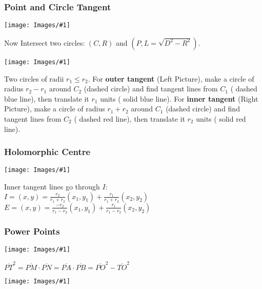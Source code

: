 \documentclass[landscape,10pt]{article}
\newcommand{\myimage}[2]{\begin{center}\texttt{[image: Images/\#1]}\end{center}}
\begin{document}
\begin{multicols*}{2}

\subsubsection*{Point and Circle Tangent}
\myimage{point_tangent.png}{1.25in}
Now Intersect two circles: $(C,R)$ and $(P,L=\sqrt{D^2-R^2})$.

\myimage{cir_cir_tang.png}{1.25in}
Two circles of radii $r_1 \leq r_2$. For {\bf outer tangent} (Left Picture), make a circle of radius $r_2-r_1$ around $C_2$ (dashed circle) and find tangent lines from $C_1$ ({\color{blue} dashed blue line}), then translate it $r_1$ units ({\color{blue} solid blue line}). For {\bf inner tangent} (Right Picture), make a circle of radius $r_1+r_2$ around $C_1$ (dashed circle) and find tangent lines from $C_2$ ({\color{red} dashed red line}), then translate it $r_2$ units ({\color{red} solid red line}).

\subsubsection*{Holomorphic Centre}
\myimage{holo_centre.pdf}{1.5in}
Inner tangent lines go through $I$: \\
$I = (x,y) = \frac{r_2}{r_1+r_2}(x_1,y_1) + \frac{r_1}{r_1+r_2}(x_2,y_2)$ \hskip 20pt
$E = (x,y) = \frac{-r_2}{r_1-r_2}(x_1,y_1) + \frac{r_1}{r_1-r_2}(x_2,y_2)$

\subsubsection*{Power Points}
\myimage{power_point.pdf}{1.5in}
$\overline{PT}^2 = \overline{PM} \cdot \overline{PN} = \overline{PA} \cdot \overline{PB} = \overline{PO}^2 - \overline{TO}^2$

\myimage{Inspiration.jpg}{1.3in}

\end{multicols*}
\end{document}
